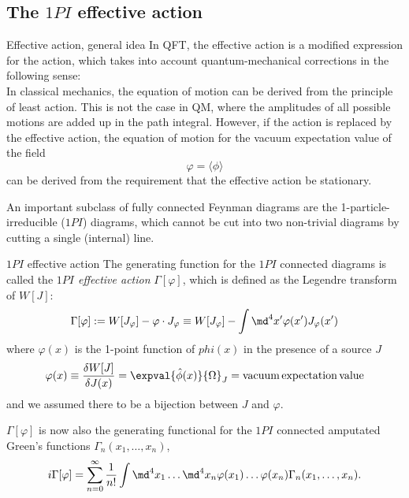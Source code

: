 \subsection{The $1PI$ effective action}
\begin{mybox}{Effective action, general idea}
	In QFT, the effective action is a modified expression for the action, which takes into account quantum-mechanical corrections in the following sense: \\
	In classical mechanics, the equation of motion can be derived from the principle of least action. This is not the case in QM, where the amplitudes of all possible motions are added up in the path integral. However, if the action is replaced by the effective action, the equation of motion for the vacuum expectation value of the field 
	\begin{equation}
		\varphi = \langle \phi \rangle 
	\end{equation}
	can be derived from the requirement that the effective action be stationary.
\end{mybox}
An important subclass of fully connected Feynman diagrams are the 1-particle-irreducible ($1PI$) diagrams, which cannot be cut into two non-trivial diagrams by cutting a single (internal) line.\\
\begin{mybox}{$1PI$ effective action}
The generating function for the $1PI$ connected diagrams is called the \emph{$1PI$ effective action} $\Gamma[\varphi]$, which is defined as the Legendre transform of $W[J]$:
\begin{equation}
	\Gamma[\varphi] := W[J_{\varphi} ] - \varphi \cdot J_{\varphi} \equiv W[J_{\varphi}] - \int \md^4 x' \varphi(x' ) J_{\varphi}(x' )
	\end{equation}
	where $\varphi(x)$ is the 1-point function of $phi(x)$ in the presence of a source $J$ 
	\begin{equation}
		\varphi(x) \equiv \frac{\delta W[J]}{\delta J(x)} = \expval{\hat{\phi}(x)}{\Omega}_J = \mathrm{vacuum\,expectation\,value}
	\end{equation}
	and we assumed there to be a bijection between $J$ and $\varphi$.
\end{mybox}
$\Gamma[\varphi]$ is now also the generating functional for the $1PI$ connected amputated Green's  functions $\Gamma_n(x_1,\dots,x_n)$,
 \begin{equation}
 	i \Gamma [\varphi] = \sum_{n=0}^{\infty } \frac{1}{n!} \int \md^4 x_1 \dots \md^4 x_n \varphi(x_1) \dots \varphi(x_n) \Gamma_n(x_1,\dots,x_n).
 \end{equation}
